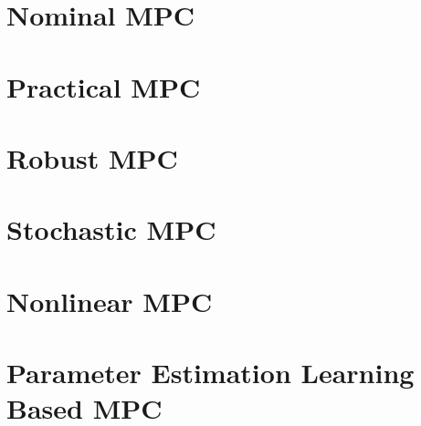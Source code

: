 \documentclass[layout=summary, columns=4,secnumdepth=2,tight]{sst-custom}
\begin{document}
\iftoggle{do-multicol}{
\begin{multicols*}{\numcolumns}}{}
  
  \iftoggle{use-small-font}{\footnotesize}{}
  \tableofcontents
  
  \section{Nominal MPC}
  
  \section{Practical MPC}
  
  \section{Robust MPC}
  
  \section{Stochastic MPC}
  
  \section{Nonlinear MPC}
  
  \section{Parameter Estimation Learning Based MPC}
  
\end{document}
